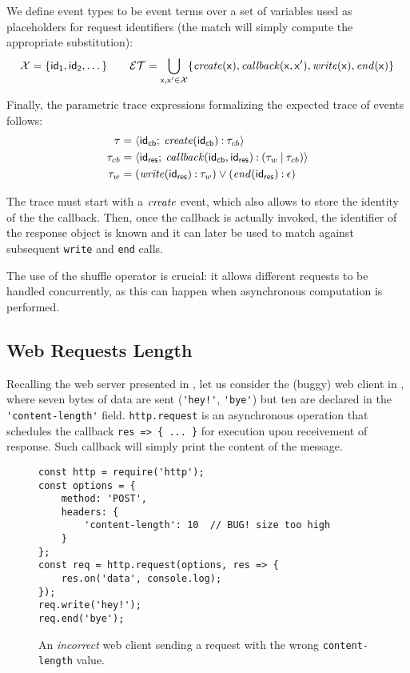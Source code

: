 We define event types to be event terms over a set of variables \vars used as placeholders for request identifiers (the match will simply compute the appropriate substitution):
\[ \mathcal{X} = \{ \mathsf{id_1}, \mathsf{id_2}, \dotsc \}\qquad
\mathcal{ET} = \bigcup_{\mathsf{x},\mathsf{x}' \in \mathcal{X}} \{\mathit{create}(\mathsf{x}), \mathit{callback}(\mathsf{x}, \mathsf{x}'), \mathit{write}(\mathsf{x}), \mathit{end}(\mathsf{x}) \} \]

Finally, the parametric trace expressions formalizing the expected trace of events follows:
\begin{align*}
	\tau &= {\langle}\mathsf{\mathsf{id_{cb}}{}};\:{\mathit{create}(\mathsf{id_{cb}}{}) \mathbin{:} \tau_{cb}}{\rangle}\\
	\tau_{cb} &= {\langle}\mathsf{\mathsf{id_{res}}{}};\:{\mathit{callback}(\mathsf{id_{cb}}, \mathsf{id_{res}}) \mathbin{:} (\tau_w \mathbin{|} \tau_{cb})}{\rangle}\\
	\tau_w &= (\mathit{write}(\mathsf{id_{res}}) \mathbin{:} \tau_w) \mathbin{\vee} (\mathit{end}(\mathsf{id_{res}}) \mathbin{:} \epsilon)
\end{align*}

The trace must start with a \(\mathit{create}\) event, which also allows to store the identity of the the callback.
Then, once the callback is actually invoked, the identifier of the response object is known and it can later be used to match against subsequent \lstinline|write| and \lstinline|end| calls.

The use of the shuffle operator is crucial: it allows different requests to be handled concurrently, as this can happen when asynchronous computation is performed.

\subsection{Web Requests Length}
\label{sec:web-req}
Recalling the web server presented in , let us consider the (buggy) web client in , where seven bytes of data are sent (\lstinline{'hey!'}, \lstinline{'bye'}) but ten are declared in the \lstinline{'content-length'} field.
\lstinline{http.request} is an asynchronous operation that schedules the callback \lstinline!res => { ... }! for execution upon receivement of response.
Such callback will simply print the content of the message.

\begin{figure}[h]
\begin{lstlisting}
const http = require('http');
const options = {
	method: 'POST',
	headers: {
		'content-length': 10  // BUG! size too high
	}
};
const req = http.request(options, res => {
	res.on('data', console.log);
});
req.write('hey!');
req.end('bye');
\end{lstlisting}
\caption{An \emph{incorrect} web client sending a request with the wrong \texttt{content-length} value.}
\label{lst:client}
\end{figure}


